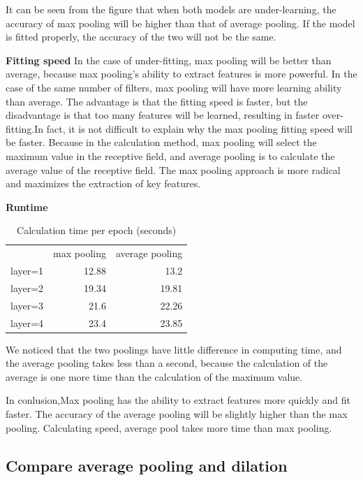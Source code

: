 \documentclass{article}
\begin{document}
It can be seen from the figure that when both models are under-learning, the accuracy of max pooling will be higher than that of average pooling. If the model is fitted properly, the accuracy of the two will not be the same.

\textbf{Fitting speed}
In the case of under-fitting, max pooling will be better than average, because max pooling's ability to extract features is more powerful. In the case of the same number of filters, max pooling will have more learning ability than average. The advantage is that the fitting speed is faster, but the disadvantage is that too many features will be learned, resulting in faster over-fitting.In fact, it is not difficult to explain why the max pooling fitting speed will be faster. Because in the calculation method, max pooling will select the maximum value in the receptive field, and average pooling is to calculate the average value of the receptive field. The max pooling approach is more radical and maximizes the extraction of key features.

\textbf{Runtime}

\begin{table}[H]
  \centering
  \caption{Calculation time per epoch (seconds)}
    \begin{tabular}{lrr}
          & \multicolumn{1}{l}{max pooling} & \multicolumn{1}{l}{average pooling} \\
    layer=1 & 12.88 & 13.2 \\
    layer=2 & 19.34 & 19.81 \\
    layer=3 & 21.6  & 22.26 \\
    layer=4 & 23.4  & 23.85 \\
    \end{tabular}%
  \label{tab:addlabel}%
\end{table}%

We noticed that the two poolings have little difference in computing time, and the average pooling takes less than a second, because the calculation of the average is one more time than the calculation of the maximum value.

In conlusion,Max pooling has the ability to extract features more quickly and fit faster. The accuracy of the average pooling will be slightly higher than the max pooling. Calculating speed, average pool takes more time than max pooling.

\subsection{Compare average pooling  and dilation}
\end{document}
